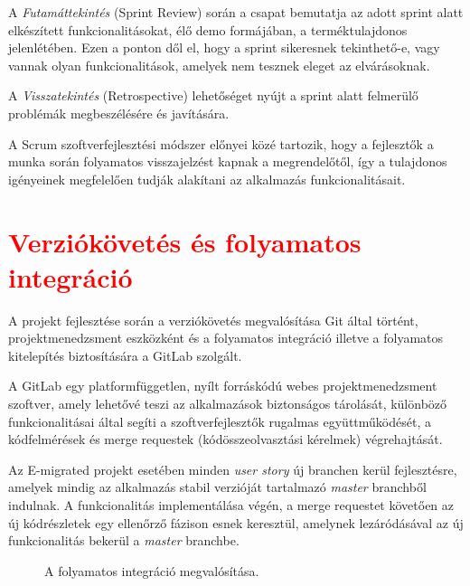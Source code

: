 A \textit{Futamáttekintés} (Sprint Review) során a csapat bemutatja az adott sprint alatt elkészített funkcionalitásokat, élő demo formájában, a terméktulajdonos jelenlétében. Ezen a ponton dől el, hogy a sprint sikeresnek tekinthető-e, vagy vannak olyan funkcionalitások, amelyek nem tesznek eleget az elvárásoknak. 

A \textit{Visszatekintés} (Retrospective) lehetőséget nyújt a sprint alatt felmerülő problémák megbeszélésére és javítására.

A Scrum szoftverfejlesztési módszer előnyei közé tartozik, hogy a fejlesztők a munka során folyamatos visszajelzést kapnak a megrendelőtől, így a tulajdonos igényeinek megfelelően tudják alakítani az alkalmazás funkcionalitásait.

\section{\textcolor{red}{Verziókövetés és folyamatos integráció}}
A projekt fejlesztése során a verziókövetés megvalósítása Git által történt, projektmenedzsment eszközként és a folyamatos integráció  \cite{CI} illetve a folyamatos kitelepítés \cite{CD}  biztosítására a GitLab szolgált. 

A GitLab egy platformfüggetlen, nyílt forráskódú webes projektmenedzsment szoftver, amely lehetővé teszi az alkalmazások biztonságos tárolását, különböző funkcionalitásai által segíti a szoftverfejlesztők rugalmas együttműködését, a kódfelmérések és merge requestek (kódösszeolvasztási kérelmek)  végrehajtását\cite{GitLabRegistry}. 

Az E-migrated projekt esetében minden \textit{user story} új branchen kerül fejlesztésre, amelyek mindig az alkalmazás stabil verzióját tartalmazó \textit{master} branchből indulnak. A funkcionalitás implementálása végén, a merge requestet követően az új kódrészletek egy ellenőrző fázison esnek keresztül, amelynek lezáródásával az új funkcionalitás bekerül a \textit{master} branchbe. 
\begin{figure}[!b]
  \centering
  \caption{A folyamatos integráció megvalósítása. }
  \label{fig:continuous_integration}
\end{figure}

